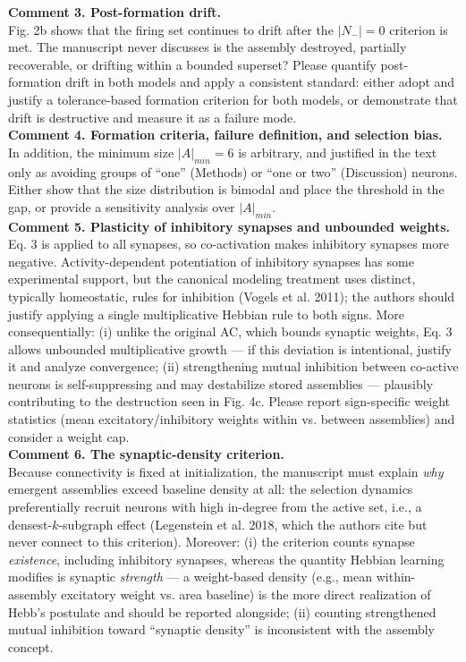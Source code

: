\documentclass[a4paper, 11pt]{article}
\begin{document}
\noindent\textbf{Comment 3. Post-formation drift.}\\
Fig. 2b shows that the firing set continues to drift after the $|N_-| = 0$ criterion is met. The manuscript never discusses is the assembly destroyed, partially recoverable, or drifting within a bounded superset? Please quantify post-formation drift in both models and apply a consistent standard: either adopt and justify a tolerance-based formation criterion for both models, or demonstrate that drift is destructive and measure it as a failure mode.\\

\noindent\textbf{Comment 4. Formation criteria, failure definition, and selection bias.}\\
In addition, the minimum size $|A|_{min} = 6$ is arbitrary, and justified in the text only as avoiding groups of ``one'' (Methods) or ``one or two'' (Discussion) neurons. Either show that the size distribution is bimodal and place the threshold in the gap, or provide a sensitivity analysis over $|A|_{min}$.\\

\noindent \textbf{Comment 5. Plasticity of inhibitory synapses and unbounded weights.}\\
Eq. 3 is applied to all synapses, so co-activation makes inhibitory synapses more negative. Activity-dependent potentiation of inhibitory synapses has some experimental support, but the canonical modeling treatment uses distinct, typically homeostatic, rules for inhibition (Vogels et al. 2011); the authors should justify applying a single multiplicative Hebbian rule to both signs. More consequentially: (i) unlike the original AC, which bounds synaptic weights, Eq. 3 allows unbounded multiplicative growth — if this deviation is intentional, justify it and analyze convergence; (ii) strengthening mutual inhibition between co-active neurons is self-suppressing and may destabilize stored assemblies — plausibly contributing to the destruction seen in Fig. 4c. Please report sign-specific weight statistics (mean excitatory/inhibitory weights within vs. between assemblies) and consider a weight cap.\\

\noindent \textbf{Comment 6. The synaptic-density criterion.}\\
Because connectivity is fixed at initialization, the manuscript must explain \emph{why} emergent assemblies exceed baseline density at all: the selection dynamics preferentially recruit neurons with high in-degree from the active set, i.e., a densest-$k$-subgraph effect (Legenstein et al. 2018, which the authors cite but never connect to this criterion). Moreover: (i) the criterion counts synapse \emph{existence}, including inhibitory synapses, whereas the quantity Hebbian learning modifies is synaptic \emph{strength} — a weight-based density (e.g., mean within-assembly excitatory weight vs. area baseline) is the more direct realization of Hebb's postulate and should be reported alongside; (ii) counting strengthened mutual inhibition toward ``synaptic density'' is inconsistent with the assembly concept.\\
\end{document}

